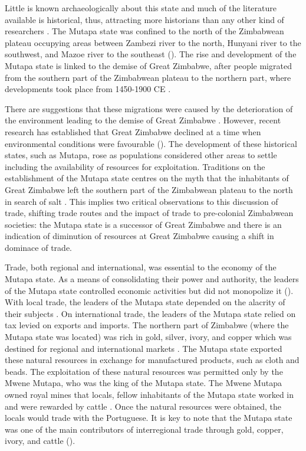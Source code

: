 Little is known archaeologically about this state and much of the literature available is historical, thus, attracting more historians than any other kind of researchers \parencite{pikirayi1993}.
The Mutapa state was confined to the north of the Zimbabwean plateau occupying areas between Zambezi river to the north, Hunyani river to the southwest, and Mazoe river to the southeast (\cite[][1]{beach1976}).
The rise and development of the Mutapa state is linked to the demise of Great Zimbabwe, after people migrated from the southern part of the Zimbabwean plateau to the northern part, where developments took place from 1450-1900 CE \parencite{pikirayi2006}.

There are suggestions that these migrations were caused by the deterioration of the environment leading to the demise of Great Zimbabwe \parencite{huffman1972}. However, recent research has established that Great Zimbabwe declined at a time when environmental conditions were favourable (\cites{pikirayi2001}{pikirayi2006}{pikirayi2017}{chirikure2017}).
The development of these historical states, such as Mutapa, rose as populations considered other areas to settle including the availability of resources for exploitation. Traditions on the establishment of the Mutapa state centres on the myth that the inhabitants of Great Zimbabwe left the southern part of the Zimbabwean plateau to the north in search of salt \parencite{ab1961}.
This implies two critical observations to this discussion of trade, shifting trade routes and the impact of trade to pre-colonial Zimbabwean societies: the Mutapa state is a successor of Great Zimbabwe and there is an indication of diminution of resources at Great Zimbabwe causing a shift in dominace of trade.

Trade, both regional and international, was essential to the economy of the Mutapa state. As a means of consolidating their power and authority, the leaders of the Mutapa state controlled economic activities but did not monopolize it
(\cites{mudenge1974}{mudenge1988}).
With local trade, the leaders of the Mutapa state depended on the alacrity of their subjects \parencite{chanaiwa1972}.
On international trade, the leaders of the Mutapa state relied on tax levied on exports and imports. The northern part of Zimbabwe (where the Mutapa state was located) was rich in gold, silver, ivory, and copper which was destined for regional and international markets
\parencite{chanaiwa1972}. The Mutapa state exported these natural resources in exchange for manufactured products, such as cloth and beads. The exploitation of these natural resources was permitted only by the Mwene Mutapa, who was the king of the Mutapa state. The Mwene Mutapa owned royal mines that locals, fellow inhabitants of the Mutapa state worked in and were rewarded by cattle \parencite{chanaiwa1972}. Once the natural resources were obtained, the locals would trade with the Portuguese. It is key to note that the Mutapa state was one of the main contributors of interregional trade through gold, copper, ivory,
and cattle (\cite[][126]{kusimba1999}).

